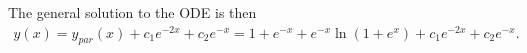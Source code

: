\documentclass[12pt,a4paper]{article}
\begin{document}
\begin{notes}
		The general solution to the ODE is then
			\begin{align*}
			y (x) = y_{par} (x) + c_1 e^{-2x} + c_2 e^{-x} = 1 + e^{-x} + e^{-x} \ln (1 + e^x ) + c_1 e^{-2x} + c_2 e^{-x} .
			\end{align*}
\end{notes}

\newpage

\phantom{2}
\end{document}
